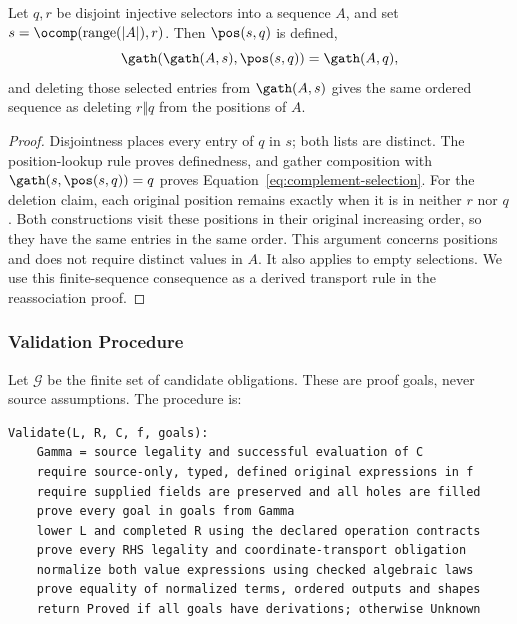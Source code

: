 \begin{lemma}
\label{lem:selection-complement}
Let $q,r$ be disjoint injective selectors into a sequence $A$, and set
$s=\ocomp(\operatorname{range}(|A|),r)$. Then $\pos(s,q)$ is defined,
\begin{equation}
 \gath(\gath(A,s),\pos(s,q))=\gath(A,q),
 \label{eq:complement-selection}
\end{equation}
and deleting those selected entries from $\gath(A,s)$ gives the same
ordered sequence as deleting $r\Vert q$ from the positions of $A$.
\end{lemma}
\begin{proof}
Disjointness places every entry of $q$ in $s$; both lists are distinct.
The position-lookup rule proves definedness, and gather composition with
$\gath(s,\pos(s,q))=q$ proves Equation~\eqref{eq:complement-selection}.
For the deletion claim, each original position remains exactly when it is
in neither $r$ nor $q$. Both constructions visit these positions in their
original increasing order, so they have the same entries in the same order.
This argument concerns positions and does not require distinct values in
$A$. It also applies to empty selections. We use this finite-sequence
consequence as a derived transport rule in the reassociation proof.
\end{proof}

\subsubsection{Validation Procedure}
\label{app:validation-procedure}
Let $\mathcal G$ be the finite set of candidate obligations. These are
proof goals, never source assumptions. The procedure is:

\noindent\begin{minipage}{\linewidth}
\begin{lstlisting}[language={},caption={Validation of a completed candidate.}]
Validate(L, R, C, f, goals):
    Gamma = source legality and successful evaluation of C
    require source-only, typed, defined original expressions in f
    require supplied fields are preserved and all holes are filled
    prove every goal in goals from Gamma
    lower L and completed R using the declared operation contracts
    prove every RHS legality and coordinate-transport obligation
    normalize both value expressions using checked algebraic laws
    prove equality of normalized terms, ordered outputs and shapes
    return Proved if all goals have derivations; otherwise Unknown
\end{lstlisting}
\end{minipage}


